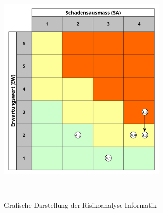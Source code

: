 \documentclass[main.tex]{subfiles} %
\begin{document}
\begin{figure}[H]
    \centering
    \includegraphics[width=0.75\textwidth]{./fig_Projektmanagement/Diagramm_Risiko_info.pdf}
    \caption{Grafische Darstellung der Risikoanalyse Informatik}~\label{fig:Diagramm_Risiko_info}
\end{figure}
\end{document}
